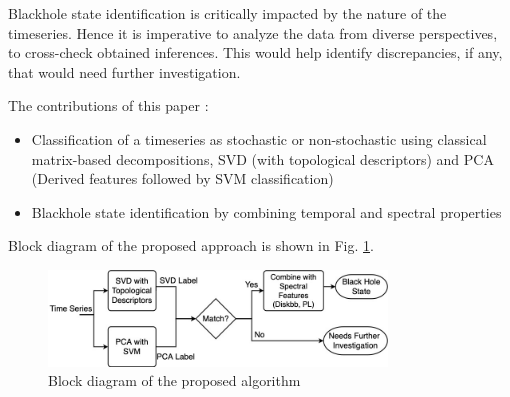 \documentclass[journal]{IEEEtran}
\begin{document}
	Blackhole state identification is critically impacted by the nature of the timeseries. Hence it is imperative to analyze the data from diverse perspectives, to cross-check obtained inferences. This would help identify discrepancies, if any, that would need further investigation.


%	

	 The contributions of this paper :
	\begin{itemize}
		\item Classification of a timeseries as stochastic or non-stochastic using classical matrix-based decompositions, SVD (with topological descriptors) and PCA (Derived features followed by SVM classification)
		\item Blackhole state identification by combining temporal and spectral properties
	\end{itemize}
	Block diagram of the proposed approach is shown in Fig. \ref{blockfig}.
	\begin{figure}[h]
		\centering
		\includegraphics[width=9cm]{time_series_block_diagram.JPG}
		\caption{Block diagram of the proposed algorithm}
		\label{blockfig}
	\end{figure}
\end{document}
